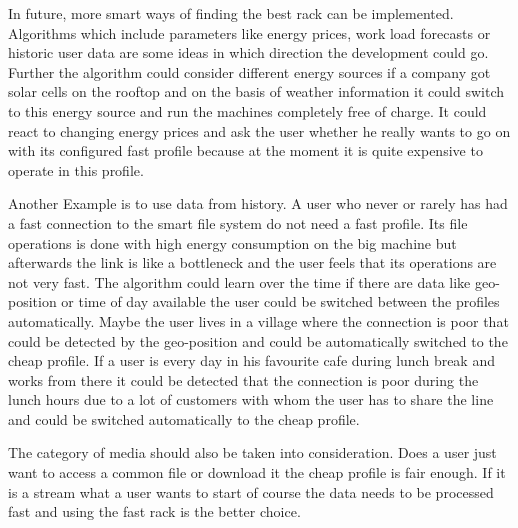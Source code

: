 \label{sec:outlook}
In future, more smart ways of finding the best rack can be implemented. Algorithms which include parameters like energy prices, work load forecasts or historic user data are some ideas in which direction the development could go. Further the algorithm could consider different energy sources if a company got solar cells on the rooftop and on the basis of weather information it could switch to this energy source and run the machines completely free of charge. It could react to changing energy prices and ask the user whether he really wants to go on with its configured fast profile because at the moment it is quite expensive to operate in this profile.

Another Example is to use data from history. A user who never or rarely has had a fast connection to the smart file system do not need a fast profile. Its file operations is done with high energy consumption on the big machine but afterwards the link is like a bottleneck and the user feels that its operations are not very fast. The algorithm could learn over the time if there are data like geo-position or time of day available the user could be switched between the profiles automatically. Maybe the user lives in a village where the connection is poor that could be detected by the geo-position and could be automatically switched to the cheap profile. If a user is every day in his favourite cafe during lunch break and works from there it could be detected that the connection is poor during the lunch hours due to a lot of customers with whom the user has to share the line and could be switched automatically to the cheap profile.

The category of media should also be taken into consideration. Does a user just want to access a common file or download it the cheap profile is fair enough. If it is a stream what a user wants to start of course the data needs to be processed fast and using the fast rack is the better choice.
